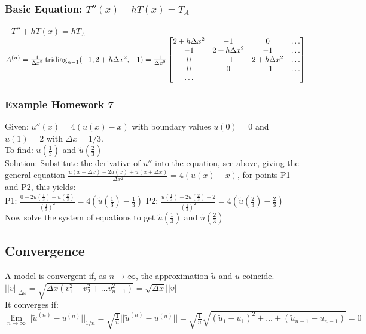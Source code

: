 \subsubsection{Basic Equation: $T''(x) -  h T(x) = T_A$}
$-T'' + h T(x) = h T_A$\\
$A^{(n)}= \frac{1}{\Delta x^2} \operatorname{tridiag}_{n-1}
(-1,2+h\Delta x^2,-1) = \frac{1}{\Delta x^2}
  \begin{bmatrix}
             2+h\Delta x^2& -1 & 0 & \ldots \\
             -1& 2+h\Delta x^2 & -1 & \ldots \\
              0& -1 & 2+h\Delta x^2 & \ldots \\
              0& 0 & -1 & \ldots \\
             \ldots
           \end{bmatrix} $

\subsubsection{Example Homework 7}
Given: $ u''(x)=4(u(x)-x) $ with boundary values $ u(0)=0 $ and $ u(1)=2 $ with $\Delta x=1/3$.
\\
To find: $ \tilde{u}(\frac{1}{3}) $ and $ \tilde{u}(\frac{2}{3}) $
\\
Solution: Substitute the derivative of $ u'' $ into the equation, see above, giving the general equation $ \frac{u(x-\Delta x)-2 u(x) + u(x+ \Delta x)}{\Delta x^2} =4 (u(x)-x) $, for points P1 and P2, this yields:
\\
P1: $ \frac{0-2 \tilde{u}(\frac{1}{3}) + \tilde{u}(\frac{2}{3})}{(\frac{1}{3})^2} =4(\tilde{u}(\frac{1}{3})-\frac{1}{3}) $
\qquad \qquad
P2: $ \frac{\tilde{u}(\frac{1}{3})-2 \tilde{u}(\frac{2}{3}) + 2}{(\frac{1}{3})^2} =4(\tilde{u}(\frac{2}{3})-\frac{2}{3}) $
\\
Now solve the system of equations to get $ \tilde{u}(\frac{1}{3}) $ and $ \tilde{u}(\frac{2}{3}) $

\subsection{Convergence}
A model is convergent if, as $n\rightarrow\infty$, the approximation $\tilde{u}$ and $u$ coincide.\\

$\boxed{||v||_{\Delta x}=\sqrt{\Delta x (v_1^2+v_2^2 + \ldots v_{n-1}^2)}= \sqrt{\Delta
x}||v||}$\\
It converges if: $\lim\limits_{n\to \infty
}||\tilde{u}^{(n)}-u^{(n)}||_{1/n}=\sqrt{\frac{1}{n}}||\tilde{u}^{(n)}-u^{(n)}||=\sqrt{\frac{1}{n}}\sqrt{(\tilde{u}_1-u_1)^2
+ \ldots + (\tilde{u}_{n-1}-u_{n-1})}=0$\\

